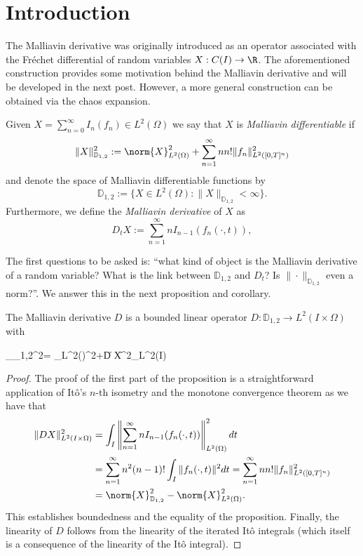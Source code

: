 \documentclass[
    a4paper,
    DIV=14,
    abstract=true,
    numbers=noenddot
]{scrartcl}
\begin{document}
\section{Introduction}
The Malliavin derivative was originally introduced as an operator associated with the Fréchet differential of random variables $X: C(I)\to \R$. The aforementioned construction provides some motivation behind the Malliavin derivative and will be developed in the next post. However, a more general construction  can be obtained via the chaos expansion.
\begin{definition}
	Given $X=\sum_{n=0}^{\infty} I_n(f_n)\in L^2(\Omega)$ we say that $X$ is \emph{Malliavin differentiable} if
	\begin{equation*}
		\|X\|_{\mathbb{D}_{1,2}}^2 := \norm{X}_{L^2(\Omega)}^2  + \sum_{n=1}^{\infty} n n!\|f_n\|_{L^2([0,T]^n)}^2
	\end{equation*}
	and denote the space of Malliavin differentiable functions by
	\begin{equation*}
		\mathbb{D}_{1,2}:=\{X\in L^2(\Omega):\|X\|_{\mathbb{D}_{1,2}}<\infty\}.
	\end{equation*}
	Furthermore, we define the \emph{Malliavin derivative} of $X$ as
	\begin{equation*}
		D_tX:=\sum_{n=1}^{\infty} n I_{n-1}(f_{n}(\cdot ,t)),
	\end{equation*}
\end{definition}
The first questions to be asked is: ``what kind of object is the Malliavin derivative of a random variable? What is the link between $\mathbb{D}_{1,2}$ and $D_t$? Is $\|\cdot \|_{\mathbb{D}_{1,2}}$ even a norm?''. We answer this in the next proposition and corollary.
\begin{proposition}
	The Malliavin derivative $D$ is a bounded linear operator  $D:\mathbb{D}_{1,2} \to L^2(I \times \Omega)$ with 
\begin{aligneq*}
	_{_{1,2}}^2= _{L^2(\Omega)}^2+\|D  X\|^2_{L^2(I\times\Omega)}
\end{aligneq*}
\end{proposition}
\begin{proof}
	The proof of the first part of the proposition is a straightforward application of Itô's $n$-th isometry and the monotone convergence theorem as we have that
	\begin{align*}
		\|D  X\|^2_{L^2(I\times\Omega)}&=\int_{I}\left\|\sum_{n=1}^{\infty} n I_{n-1}(f_{n}(\cdot ,t))\right\|_{L^2(\Omega)}^2 d t\\
		&=\sum_{n=1}^{\infty} n^2(n-1)!\int_{I}\|f_n(\cdot ,t)\|^2 dt=\sum_{n=1}^{\infty} n n!\|f_{n}\|^2_{L^2([0,T]^n)}\\
		&=\norm{X}_{\mathbb{D}_{1,2}}^2- \norm{X}_{L^2(\Omega)}^2.
	\end{align*}
	This establishes boundedness and the equality of the proposition. Finally, the linearity of $D$ follows from the linearity of the iterated Itô integrals (which itself is a consequence of the linearity of the Itô integral).
\end{proof}
\end{document}
